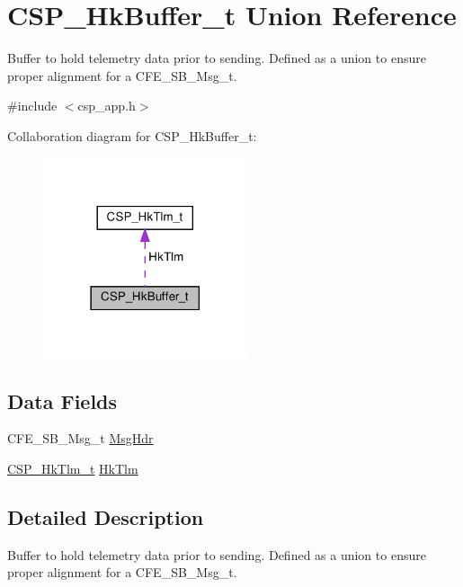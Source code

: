 \hypertarget{unionCSP__HkBuffer__t}{}\section{C\+S\+P\+\_\+\+Hk\+Buffer\+\_\+t Union Reference}
\label{unionCSP__HkBuffer__t}


Buffer to hold telemetry data prior to sending. Defined as a union to ensure proper alignment for a C\+F\+E\+\_\+\+S\+B\+\_\+\+Msg\+\_\+t.  




{\ttfamily \#include $<$csp\+\_\+app.\+h$>$}



Collaboration diagram for C\+S\+P\+\_\+\+Hk\+Buffer\+\_\+t\+:
\nopagebreak
\begin{figure}[H]
\begin{center}
\leavevmode
\includegraphics[width=170pt]{unionCSP__HkBuffer__t__coll__graph}
\end{center}
\end{figure}
\subsection*{Data Fields}
\begin{DoxyCompactItemize}
\item 
C\+F\+E\+\_\+\+S\+B\+\_\+\+Msg\+\_\+t \hyperlink{unionCSP__HkBuffer__t_ab06dc89ee8d1c682765ee2907ae33419}{Msg\+Hdr}
\item 
\hyperlink{structCSP__HkTlm__t}{C\+S\+P\+\_\+\+Hk\+Tlm\+\_\+t} \hyperlink{unionCSP__HkBuffer__t_a13efbc08e5a9383cbc2cc5206fcbc5d6}{Hk\+Tlm}
\end{DoxyCompactItemize}


\subsection{Detailed Description}
Buffer to hold telemetry data prior to sending. Defined as a union to ensure proper alignment for a C\+F\+E\+\_\+\+S\+B\+\_\+\+Msg\+\_\+t. 

